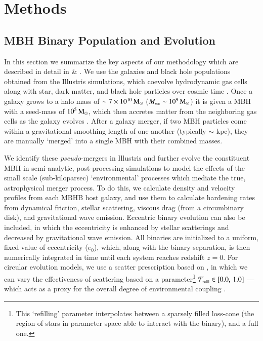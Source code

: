 \documentclass[useAMS, usenatbib]{mnras}  %
\newcommand{\frefill}{\mathcal{F}_\trt{refill}}
\begin{document}
\section{Methods}
    \label{sec:methods}

    \subsection{MBH Binary Population and Evolution}

        In this section we summarize the key aspects of our methodology which are described in detail in \citet{paper1} \& \citet{paper2}.  We use the galaxies and black hole populations obtained from the Illustris simulations, which coevolve hydrodynamic gas cells along with star, dark matter, and black hole particles over cosmic time \citep{vogelsberger2014b, genel2014, torrey2014, nelson2015}.  Once a galaxy grows to a halo mass of $\sim 7\times\nobreak10^{10} \, \textrm{M}_{\odot}$ ($M_{\textrm{\tiny{star}}} \sim 10^9 \, \textrm{M}_{\odot}$) it is given a MBH with a seed-mass of $10^5 \, \textrm{M}_{\odot}$, which then accretes matter from the neighboring gas cells as the galaxy evolves \citep{vogelsberger2013, sijacki2015}.  After a galaxy merger, if two MBH particles come within a gravitational smoothing length of one another (typically $\sim$ kpc), they are manually `merged' into a single MBH with their combined masses.

        We identify these \textit{pseudo}-mergers in Illustris and further evolve the constituent MBH in semi-analytic, post-processing simulations to model the effects of the small scale (sub-kiloparsec) `environmental' processes which mediate the true, astrophysical merger process.  To do this, we calculate density and velocity profiles from each MBHB host galaxy, and use them to calculate hardening rates from dynamical friction, stellar scattering, viscous drag (from a circumbinary disk), and gravitational wave emission.  Eccentric binary evolution can also be included, in which the eccentricity is enhanced by stellar scatterings and decreased by gravitational wave emission.  All binaries are initialized to a uniform, fixed value of eccentricity ($e_0$), which, along with the binary separation, is then numerically integrated in time until each system reaches redshift $z = 0$.  For circular evolution models, we use a scatter prescription based on \citet{magorrian1999}, in which we can vary the effectiveness of scattering based on a parameter\footnote{This `refilling' parameter interpolates between a sparsely filled loss-cone (the region of stars in parameter space able to interact with the binary), and a full one.} $\frefill \in [0.0, \, 1.0]$ --- which acts as a proxy for the overall degree of environmental coupling \citep[see][]{paper1}.
\end{document}
